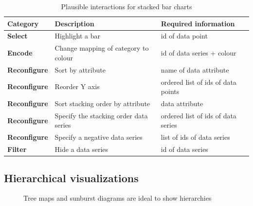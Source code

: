 \begin{table}[H]
  \caption{Plausible interactions for stacked bar charts}%
  \label{tab:analysis:stacked-bar-chart:interactions}
  \begin{tabular*}{\textwidth}{lll}
    \bf Category & \bf Description & \bf Required information \\
    \hline
    \bf Select & Highlight a bar & id of data point \\
    \bf Encode & Change mapping of category to colour & id of data series + colour \\
    \bf Reconfigure & Sort by attribute & name of data attribute \\
    \bf Reconfigure & Reorder Y axis & ordered list of ids of data points \\
    \bf Reconfigure & Sort stacking order by attribute & data attribute \\
    \bf Reconfigure & Specify the stacking order data series & ordered list of ids of data series \\
    \bf Reconfigure & Specify a negative data series & list of ids of data series \\
    \bf Filter & Hide a data series & id of data series \\
  \end{tabular*}
\end{table}


\subsection{Hierarchical visualizations}

\begin{figure}
  \centering
  \caption{Tree maps and sunburst diagrams are ideal to show hierarchies}%
  \label{fig:analysis:hierarchies}
  \qquad
\end{figure}


